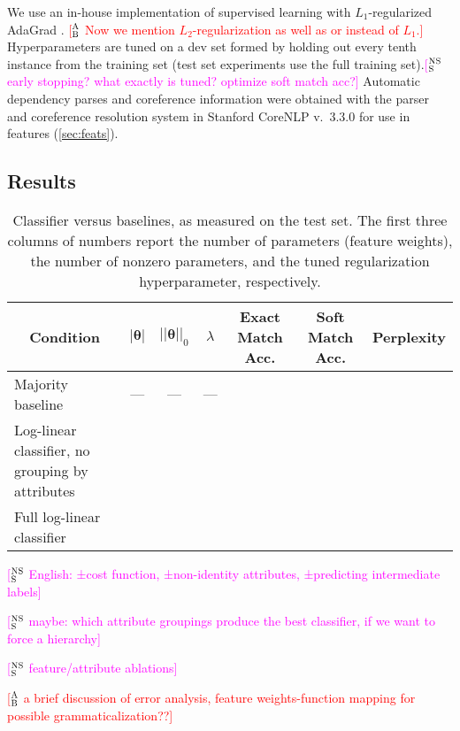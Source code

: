 \documentclass[11pt,letterpaper]{article}
\newcommand{\ensuretext}[1]{#1}
\newcommand{\nssmarker}{\ensuretext{\textcolor{magenta}{\ensuremath{^{\textsc{NS}}_{\textsc{S}}}}}}
\newcommand{\abmarker}{\ensuretext{\textcolor{red}{\ensuremath{^{\textsc{A}}_{\textsc{B}}}}}}
\newcommand{\arkcomment}[3]{\ensuretext{\textcolor{#3}{[#1 #2]}}}
\newcommand{\nss}[1]{\arkcomment{\nssmarker}{#1}{magenta}}
\newcommand{\ab}[1]{\arkcomment{\abmarker}{#1}{red}}
\begin{document}
We use an in-house implementation of supervised learning with $L_1$-regularized AdaGrad \citep{adagrad}. \ab{Now we mention $L_2$-regularization as well as or instead of $L_1$.}
Hyperparameters are tuned on a dev set formed by holding out every tenth instance from the training set 
(test set experiments use the full training set).\nss{early stopping? what exactly is tuned? optimize soft match acc?} 
Automatic dependency parses and coreference information were obtained with 
the parser and coreference resolution system in Stanford CoreNLP v.~3.3.0 \citep{socher-13,recasens-13}
for use in features (\cref{sec:feats}).

\subsection{Results}

\begin{table*}\small\centering
\begin{tabular}{@{}lrrrrrr@{}}
\multicolumn{1}{c}{\bf Condition} & \multicolumn{1}{c}{$|\boldsymbol{\theta}|$} & \multicolumn{1}{c}{$||\boldsymbol{\theta}||_0$} & \multicolumn{1}{c}{$\lambda$} 
& \multicolumn{1}{c}{\bf Exact Match Acc.} & \multicolumn{1}{c}{\bf Soft Match Acc.} 
& \multicolumn{1}{c}{\bf Perplexity} \\
\midrule
Majority baseline & \multicolumn{1}{c}{---} & \multicolumn{1}{c}{---} & \multicolumn{1}{c}{---} & \\
Log-linear classifier, no grouping by attributes & & \\
Full log-linear classifier & & \\
\end{tabular}
\caption{Classifier versus baselines, as measured on the test set. 
The first three columns of numbers report the number of parameters (feature weights), the number of nonzero parameters, 
and the tuned regularization hyperparameter, respectively.}
\label{tbl:results}
\end{table*}

\nss{English: ±cost function, ±non-identity attributes, ±predicting intermediate labels}

\nss{maybe: which attribute groupings produce the best classifier, if we want to force a hierarchy}

\nss{feature/attribute ablations}

\ab{a brief discussion of error analysis, feature weights-function mapping for possible grammaticalization??}
\end{document}
